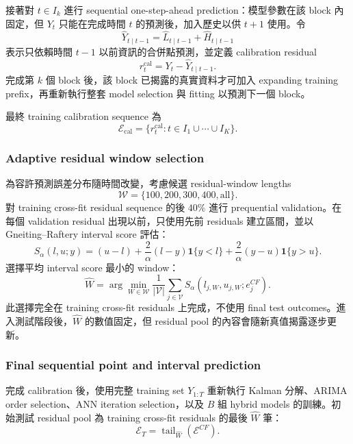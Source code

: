 {接著對 $t\in I_k$ 進行 sequential one-step-ahead prediction：模型參數在該 block 內固定，但 $Y_t$ 只能在完成時間 $t$ 的預測後，加入歷史以供 $t+1$ 使用。令
\[
    \widehat Y_{t\mid t-1}
    =\widehat L_{t\mid t-1}+\widehat H_{t\mid t-1}
\]
表示只依賴時間 $t-1$ 以前資訊的合併點預測，並定義 calibration residual
\[
    r_t^{\mathrm{cal}}
    =Y_t-\widehat Y_{t\mid t-1}.
\]
完成第 $k$ 個 block 後，該 block 已揭露的真實資料才可加入 expanding training prefix，再重新執行整套 model selection 與 fitting 以預測下一個 block。

最終 training calibration sequence 為
\[
    \mathcal E_{\mathrm{cal}}
    =\{r_t^{\mathrm{cal}}:t\in I_1\cup\cdots\cup I_K\}.
\]
\subsubsection*{Adaptive residual window selection}

為容許預測誤差分布隨時間改變，考慮候選 residual-window lengths
\[
    \mathcal W=\{100,200,300,400,\mathrm{all}\}.
\]
對 training cross-fit residual sequence 的後 $40\%$ 進行 prequential validation。在每個 validation residual 出現以前，只使用先前 residuals 建立區間，並以 Gneiting--Raftery interval score 評估：
\[
S_{\alpha}(l,u;y)
=(u-l)
+\frac{2}{\alpha}(l-y)\mathbf 1\{y<l\}
+\frac{2}{\alpha}(y-u)\mathbf 1\{y>u\}.
\]
選擇平均 interval score 最小的 window：
\[
    \widehat W
    =\arg\min_{W\in\mathcal W}
    \frac{1}{|\mathcal V|}
    \sum_{j\in\mathcal V}S_{\alpha}(l_{j,W},u_{j,W};e_j^{CF}).
\]
此選擇完全在 training cross-fit residuals 上完成，不使用 final test outcomes。進入測試階段後，$\widehat W$ 的數值固定，但 residual pool 的內容會隨新真值揭露逐步更新。

\subsubsection*{Final sequential point and interval prediction}
    
完成 calibration 後，使用完整 training set $Y_{1:T}$ 重新執行 Kalman 分解、ARIMA order selection、ANN iteration selection，以及 $B$ 組 hybrid models 的訓練。初始測試 residual pool 為 training cross-fit residuals 的最後 $\widehat W$ 筆：
\[
    \mathcal E_T
    =\operatorname{tail}_{\widehat W}(\mathcal E^{CF}).
\]

}
